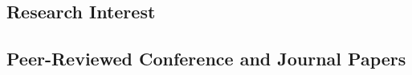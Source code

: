 \documentclass{chencv}
\affiliation{University of California, Los Angeles}
\begin{document}
\makecvtitle

\subsection{\bfseries Research Interest}

\vspace{-0.25em}
%

%

\subsection{\bfseries Peer-Reviewed Conference and Journal Papers}

%
%
%
%
%
%
%
%
%
%
%
%
%
\end{document}
